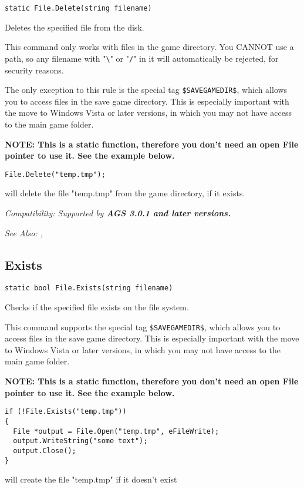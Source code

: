 \begin{verbatim}
static File.Delete(string filename)
\end{verbatim}
Deletes the specified file from the disk.

This command only works with files in the game directory.
You CANNOT use a path, so any filename with "\verb$\$" or "\verb$/$" in it will
automatically be rejected, for security reasons.

The only exception to this rule is the special tag \verb^$SAVEGAMEDIR$^, which allows
you to access files in the save game directory. This is especially important with
the move to Windows Vista or later versions, in which you may not have access to the main game folder.

\bf{NOTE:} This is a static function, therefore you don't need an open File pointer
to use it. See the example below.

\begin{verbatim}
File.Delete("temp.tmp");
\end{verbatim}
will delete the file "temp.tmp" from the game directory, if it exists.

\it{Compatibility:} Supported by \bf{AGS 3.0.1} and later versions.

\it{See Also:} , 


\subsection{Exists}\label{File.Exists}%

\begin{verbatim}
static bool File.Exists(string filename)
\end{verbatim}
Checks if the specified file exists on the file system.

This command supports the special tag \verb^$SAVEGAMEDIR$^, which allows
you to access files in the save game directory. This is especially important with
the move to Windows Vista or later versions, in which you may not have access to the main game folder.

\bf{NOTE:} This is a static function, therefore you don't need an open File pointer
to use it. See the example below.

\begin{verbatim}
if (!File.Exists("temp.tmp"))
{
  File *output = File.Open("temp.tmp", eFileWrite);
  output.WriteString("some text");
  output.Close();
}
\end{verbatim}
will create the file "temp.tmp" if it doesn't exist

